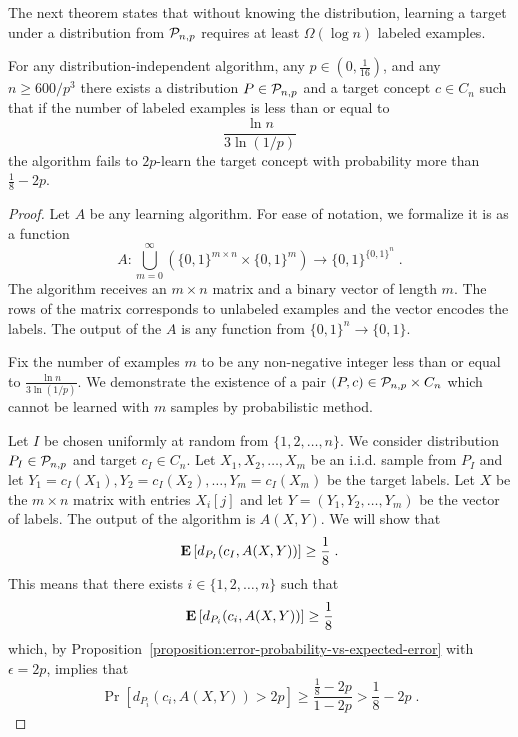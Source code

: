 The next theorem states that without knowing the distribution,
learning a target under a distribution from $\P_{n,p}$
requires at least $\Omega(\log n)$ labeled examples.

\begin{theorem}
For any distribution-independent algorithm, any $p \in (0,\frac{1}{16})$, and any
$n \ge 600/p^3$ there exists a distribution $P \in \P_{n,p}$ and a target
concept $c \in C_n$ such that if the number of labeled examples is less than or equal to
$$
\frac{\ln n}{3 \ln (1/p)}
$$
the algorithm fails to $2p$-learn the
target concept with probability more than $\frac{1}{8} - 2p$.
\end{theorem}

\begin{proof}
Let $A$ be any learning algorithm. For ease of notation, we formalize it is as a function
$$
A:\bigcup_{m=0}^\infty \left(\{0,1\}^{m \times n} \times \{0,1\}^m\right) \to \{0,1\}^{\{0,1\}^n} \; .
$$
The algorithm receives an $m \times n$ matrix and a binary vector of length $m$.
The rows of the matrix corresponds to unlabeled examples and the vector encodes
the labels. The output of the $A$ is any function from $\{0,1\}^n \to \{0,1\}$.

Fix the number of examples $m$ to be any non-negative integer less than or equal
to  $\frac{\ln n}{3 \ln(1/p)}$. We demonstrate the existence of a pair $(P,c)
\in \P_{n,p} \times C_n$ which cannot be learned with $m$ samples by
probabilistic method.

Let $I$ be chosen uniformly at random from $\{1,2,\dots,n\}$. We consider distribution
$P_I \in \P_{n,p}$ and target $c_I \in C_n$. Let $X_1, X_2, \dots, X_m$ be an
i.i.d. sample from $P_I$ and let $Y_1 = c_I(X_1), Y_2 = c_I(X_2), \dots, Y_m =
c_I(X_m)$ be the target labels. Let $X$ be the $m \times n$ matrix with entries
$X_i[j]$ and let $Y = (Y_1, Y_2, \dots, Y_m)$ be the vector of labels. The
output of the algorithm is $A(X,Y)$. We will show that
\begin{equation}
\label{equation:failure-probability}
\Exp \left[d_{P_I}(c_I, A(X,Y)) \right] \ge \frac{1}{8} \; .
\end{equation}
This means that there exists $i \in \{1,2,\dots,n\}$ such that
$$
\Exp \left[d_{P_i}(c_i, A(X,Y)) \right] \ge \frac{1}{8}
$$
which, by Proposition~\ref{proposition:error-probability-vs-expected-error} with $\epsilon=2p$, implies that
$$
\Pr \left[ d_{P_i}(c_i, A(X,Y)) > 2p \right] \ge \frac{\frac{1}{8} - 2p}{1 - 2p} > \frac{1}{8} - 2p \; .
$$


\end{proof}
